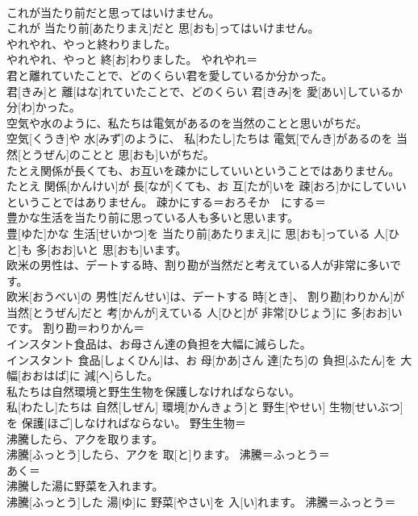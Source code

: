 \documentclass[8pt]{extreport}
\begin{document}
\begin{CJK}{UTF8}{min}
\\	これが当たり前だと思ってはいけません。	
\\	これが 当たり前[あたりまえ]だと 思[おも]ってはいけません。	
\\	やれやれ、やっと終わりました。	
\\	やれやれ、やっと 終[お]わりました。	やれやれ＝ 
\\	君と離れていたことで、どのくらい君を愛しているか分かった。	
\\	君[きみ]と 離[はな]れていたことで、どのくらい 君[きみ]を 愛[あい]しているか 分[わ]かった。	
\\	空気や水のように、私たちは電気があるのを当然のことと思いがちだ。	
\\	空気[くうき]や 水[みず]のように、 私[わたし]たちは 電気[でんき]があるのを 当然[とうぜん]のことと 思[おも]いがちだ。	
\\	たとえ関係が長くても、お互いを疎かにしていいということではありません。	
\\	たとえ 関係[かんけい]が 長[なが]くても、お 互[たが]いを 疎[おろ]かにしていいということではありません。	疎かにする＝おろそか　にする＝ 
\\	豊かな生活を当たり前に思っている人も多いと思います。	
\\	豊[ゆた]かな 生活[せいかつ]を 当たり前[あたりまえ]に 思[おも]っている 人[ひと]も 多[おお]いと 思[おも]います。	
\\	欧米の男性は、デートする時、割り勘が当然だと考えている人が非常に多いです。	
\\	欧米[おうべい]の 男性[だんせい]は、デートする 時[とき]、 割り勘[わりかん]が 当然[とうぜん]だと 考[かんが]えている 人[ひと]が 非常[ひじょう]に 多[おお]いです。	割り勘＝わりかん＝ 
\\	インスタント食品は、お母さん達の負担を大幅に減らした。	
\\	インスタント 食品[しょくひん]は、お 母[かあ]さん 達[たち]の 負担[ふたん]を 大幅[おおはば]に 減[へ]らした。	
\\	私たちは自然環境と野生生物を保護しなければならない。	
\\	私[わたし]たちは 自然[しぜん] 環境[かんきょう]と 野生[やせい] 生物[せいぶつ]を 保護[ほご]しなければならない。	野生生物＝ 
\\	沸騰したら、アクを取ります。	
\\	沸騰[ふっとう]したら、アクを 取[と]ります。	沸騰＝ふっとう＝ 
\\	あく＝ 
\\	沸騰した湯に野菜を入れます。	
\\	沸騰[ふっとう]した 湯[ゆ]に 野菜[やさい]を 入[い]れます。	沸騰＝ふっとう＝ 

\end{CJK}
\end{document}
